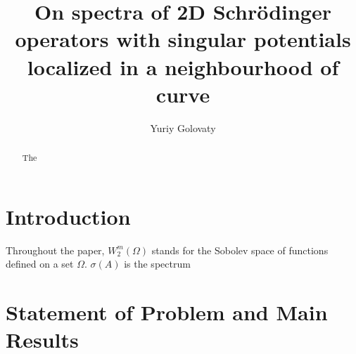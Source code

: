 \documentclass[reqno]{amsart}
\theoremstyle{plain}
\numberwithin{equation}{section}
\begin{document}
\title[2D Schr\"{o}dinger operators with singular potentials]
{On spectra of 2D Schr\"{o}dinger operators with singular potentials localized in a neighbourhood of curve}





\author{Yuriy Golovaty}%
\address{Department of Mechanics and Mathematics,
  Ivan Franko National University of Lviv\\
  1 Universytetska str., 79000 Lviv, Ukraine}



\begin{abstract}
The
\end{abstract}


\keywords{}
\maketitle






\section{Introduction  }
\label{Sec:Introduction}




Throughout the paper, $W_2^m(\Omega)$ stands for the Sobolev space of functions defined on a set $\Omega$. $\sigma(A)$ is the spectrum








\section{Statement of Problem and Main Results}
\label{Sec:Statment}
\end{document}
